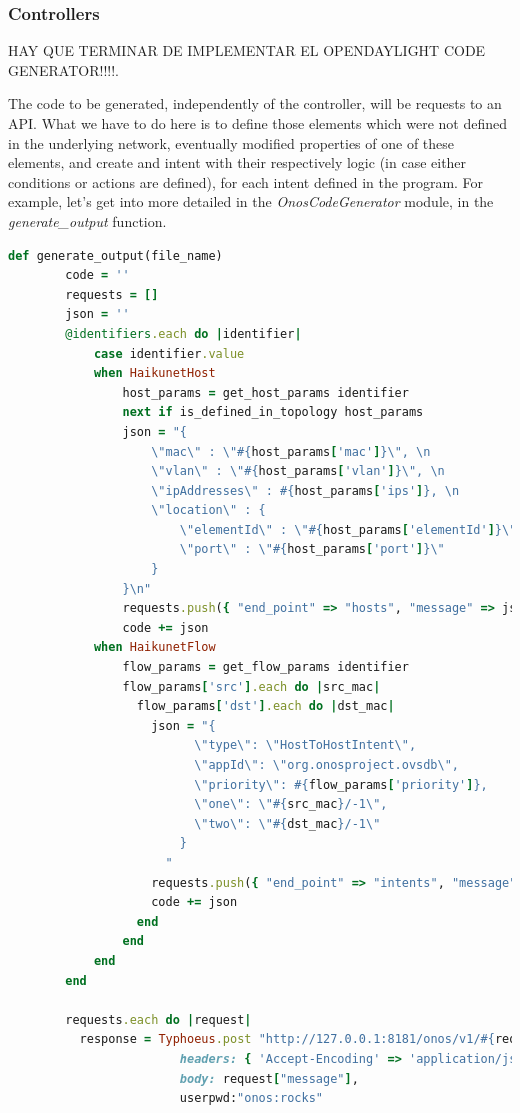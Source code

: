 \subsubsection{Controllers}
HAY QUE TERMINAR DE IMPLEMENTAR EL OPENDAYLIGHT CODE GENERATOR!!!!.

The code to be generated, independently of the controller, will be requests to an API. What we have to do here is to define those elements which were not defined in the underlying network, eventually modified properties of one of these elements, and create and intent with their respectively logic (in case either conditions or actions are defined), for each intent defined in the program. For example, let's get into more detailed in the \textit{OnosCodeGenerator} module, in the \textit{generate\_output} function.

\begin{lstlisting}[language=Ruby,breaklines=true]
    def generate_output(file_name)
        code = ''
        requests = []
        json = ''
        @identifiers.each do |identifier|
            case identifier.value
            when HaikunetHost
                host_params = get_host_params identifier
                next if is_defined_in_topology host_params
                json = "{
                    \"mac\" : \"#{host_params['mac']}\", \n
                    \"vlan\" : \"#{host_params['vlan']}\", \n
                    \"ipAddresses\" : #{host_params['ips']}, \n
                    \"location\" : {
                        \"elementId\" : \"#{host_params['elementId']}\", \n
                        \"port\" : \"#{host_params['port']}\"
                    }
                }\n"
                requests.push({ "end_point" => "hosts", "message" => json })
                code += json
            when HaikunetFlow
                flow_params = get_flow_params identifier
                flow_params['src'].each do |src_mac|
                  flow_params['dst'].each do |dst_mac|
                    json = "{
                          \"type\": \"HostToHostIntent\",
                          \"appId\": \"org.onosproject.ovsdb\",
                          \"priority\": #{flow_params['priority']},
                          \"one\": \"#{src_mac}/-1\",
                          \"two\": \"#{dst_mac}/-1\"
                        }
                      "
                    requests.push({ "end_point" => "intents", "message" => json })
                    code += json
                  end
                end
            end
        end

        requests.each do |request|
          response = Typhoeus.post "http://127.0.0.1:8181/onos/v1/#{request['end_point']}",
                        headers: { 'Accept-Encoding' => 'application/json', 'Content-Type' => 'application/json'},
                        body: request["message"],
                        userpwd:"onos:rocks"


\end{lstlisting}
